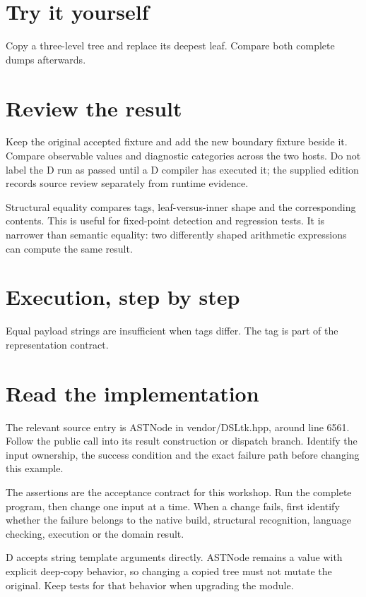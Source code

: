 \section*{Try it yourself}
Copy a three-level tree and replace its deepest leaf. Compare both complete dumps afterwards.

\section*{Review the result}
Keep the original accepted fixture and add the new boundary fixture beside it. Compare observable values and diagnostic categories across the two hosts. Do not label the D run as passed until a D compiler has executed it; the supplied edition records source review separately from runtime evidence.

\clearpage
{}
Structural equality compares tags, leaf-versus-inner shape and the corresponding contents. This is useful for fixed-point detection and regression tests. It is narrower than semantic equality: two differently shaped arithmetic expressions can compute the same result.


\section*{Execution, step by step}
Equal payload strings are insufficient when tags differ. The tag is part of the representation contract.

\section*{Read the implementation}
The relevant source entry is ASTNode in vendor/DSLtk.hpp, around line 6561. Follow the public call into its result construction or dispatch branch. Identify the input ownership, the success condition and the exact failure path before changing this example.

The assertions are the acceptance contract for this workshop. Run the complete program, then change one input at a time. When a change fails, first identify whether the failure belongs to the native build, structural recognition, language checking, execution or the domain result.

\clearpage
{}
D accepts string template arguments directly. ASTNode remains a value with explicit deep-copy behavior, so changing a copied tree must not mutate the original. Keep tests for that behavior when upgrading the module.

